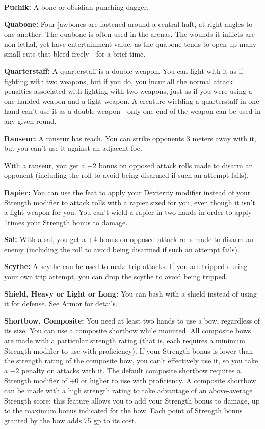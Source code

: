 \textbf{Puchik:} A bone or obsidian punching dagger.

\textbf{Quabone:} Four jawbones are fastened around a central haft, at right angles to one another. The quabone is often used in the arenas. The wounds it inflicts are non-lethal, yet have entertainment value, as the quabone tends to open up many small cuts that bleed freely---for a brief time.

\textbf{Quarterstaff:} A quarterstaff is a double weapon. You can fight with it as if fighting with two weapons, but if you do, you incur all the normal attack penalties associated with fighting with two weapons, just as if you were using a one-handed weapon and a light weapon. A creature wielding a quarterstaff in one hand can't use it as a double weapon---only one end of the weapon can be used in any given round. 

\textbf{Ranseur:} A ranseur has reach. You can strike opponents 3 meters away with it, but you can't use it against an adjacent foe.

With a ranseur, you get a +2 bonus on opposed attack rolls made to disarm an opponent (including the roll to avoid being disarmed if such an attempt fails). 

\textbf{Rapier:} You can use the  feat to apply your Dexterity modifier instead of your Strength modifier to attack rolls with a rapier sized for you, even though it isn't a light weapon for you. You can't wield a rapier in two hands in order to apply 1\onehalf times your Strength bonus to damage. 

\textbf{Sai:} With a sai, you get a +4 bonus on opposed attack rolls made to disarm an enemy (including the roll to avoid being disarmed if such an attempt fails). 

\textbf{Scythe:} A scythe can be used to make trip attacks. If you are tripped during your own trip attempt, you can drop the scythe to avoid being tripped. 

\textbf{Shield, Heavy or Light or Long:} You can bash with a shield instead of using it for defense. See Armor for details. 

\textbf{Shortbow, Composite:} You need at least two hands to use a bow, regardless of its size. You can use a composite shortbow while mounted. All composite bows are made with a particular strength rating (that is, each requires a minimum Strength modifier to use with proficiency). If your Strength bonus is lower than the strength rating of the composite bow, you can't effectively use it, so you take a $-2$ penalty on attacks with it. The default composite shortbow requires a Strength modifier of +0 or higher to use with proficiency. A composite shortbow can be made with a high strength rating to take advantage of an above-average Strength score; this feature allows you to add your Strength bonus to damage, up to the maximum bonus indicated for the bow. Each point of Strength bonus granted by the bow adds 75 gp to its cost.

